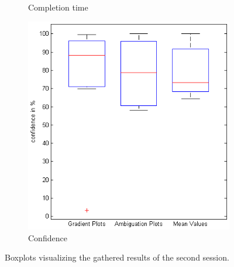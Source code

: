 \begin{figure}[H]
\begin{subfigure}[b]{0.32\textwidth}
        \caption{Completion time}
        \label{fig:s2_time}
    \end{subfigure}
		\begin{subfigure}[b]{0.32\textwidth}
        \includegraphics[width=\textwidth]{figures/boxplots/s2_confidence.png}
        \caption{Confidence}
        \label{fig:s2_confidence}
    \end{subfigure}
    \caption{Boxplots visualizing the gathered results of the second session.}
		\label{fig:s2_boxplots}
\end{figure}

